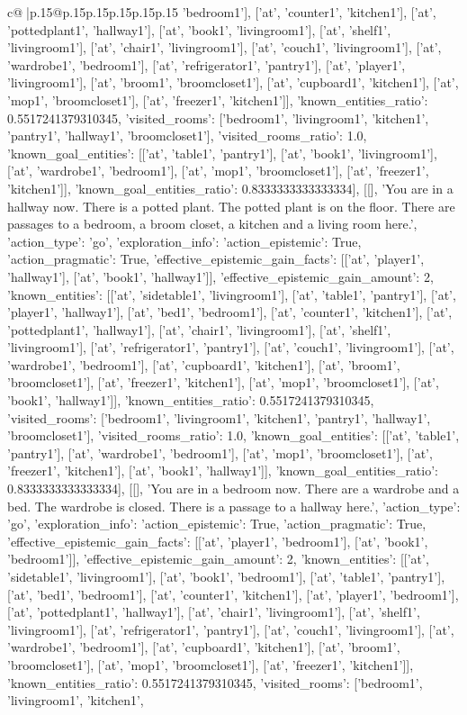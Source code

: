 \documentclass{article}
\begin{document}
{\begin{supertabular}{c@{$\;$}|p{.15\linewidth}@{}p{.15\linewidth}p{.15\linewidth}p{.15\linewidth}p{.15\linewidth}p{.15\linewidth}}
{{{'bedroom1'], ['at', 'counter1', 'kitchen1'], ['at', 'pottedplant1', 'hallway1'], ['at', 'book1', 'livingroom1'], ['at', 'shelf1', 'livingroom1'], ['at', 'chair1', 'livingroom1'], ['at', 'couch1', 'livingroom1'], ['at', 'wardrobe1', 'bedroom1'], ['at', 'refrigerator1', 'pantry1'], ['at', 'player1', 'livingroom1'], ['at', 'broom1', 'broomcloset1'], ['at', 'cupboard1', 'kitchen1'], ['at', 'mop1', 'broomcloset1'], ['at', 'freezer1', 'kitchen1']], 'known_entities_ratio': 0.5517241379310345, 'visited_rooms': ['bedroom1', 'livingroom1', 'kitchen1', 'pantry1', 'hallway1', 'broomcloset1'], 'visited_rooms_ratio': 1.0, 'known_goal_entities': [['at', 'table1', 'pantry1'], ['at', 'book1', 'livingroom1'], ['at', 'wardrobe1', 'bedroom1'], ['at', 'mop1', 'broomcloset1'], ['at', 'freezer1', 'kitchen1']], 'known_goal_entities_ratio': 0.8333333333333334}}], [[], 'You are in a hallway now. There is a potted plant. The potted plant is on the floor. There are passages to a bedroom, a broom closet, a kitchen and a living room here.', {'action_type': 'go', 'exploration_info': {'action_epistemic': True, 'action_pragmatic': True, 'effective_epistemic_gain_facts': [['at', 'player1', 'hallway1'], ['at', 'book1', 'hallway1']], 'effective_epistemic_gain_amount': 2, 'known_entities': [['at', 'sidetable1', 'livingroom1'], ['at', 'table1', 'pantry1'], ['at', 'player1', 'hallway1'], ['at', 'bed1', 'bedroom1'], ['at', 'counter1', 'kitchen1'], ['at', 'pottedplant1', 'hallway1'], ['at', 'chair1', 'livingroom1'], ['at', 'shelf1', 'livingroom1'], ['at', 'refrigerator1', 'pantry1'], ['at', 'couch1', 'livingroom1'], ['at', 'wardrobe1', 'bedroom1'], ['at', 'cupboard1', 'kitchen1'], ['at', 'broom1', 'broomcloset1'], ['at', 'freezer1', 'kitchen1'], ['at', 'mop1', 'broomcloset1'], ['at', 'book1', 'hallway1']], 'known_entities_ratio': 0.5517241379310345, 'visited_rooms': ['bedroom1', 'livingroom1', 'kitchen1', 'pantry1', 'hallway1', 'broomcloset1'], 'visited_rooms_ratio': 1.0, 'known_goal_entities': [['at', 'table1', 'pantry1'], ['at', 'wardrobe1', 'bedroom1'], ['at', 'mop1', 'broomcloset1'], ['at', 'freezer1', 'kitchen1'], ['at', 'book1', 'hallway1']], 'known_goal_entities_ratio': 0.8333333333333334}}], [[], 'You are in a bedroom now. There are a wardrobe and a bed. The wardrobe is closed. There is a passage to a hallway here.', {'action_type': 'go', 'exploration_info': {'action_epistemic': True, 'action_pragmatic': True, 'effective_epistemic_gain_facts': [['at', 'player1', 'bedroom1'], ['at', 'book1', 'bedroom1']], 'effective_epistemic_gain_amount': 2, 'known_entities': [['at', 'sidetable1', 'livingroom1'], ['at', 'book1', 'bedroom1'], ['at', 'table1', 'pantry1'], ['at', 'bed1', 'bedroom1'], ['at', 'counter1', 'kitchen1'], ['at', 'player1', 'bedroom1'], ['at', 'pottedplant1', 'hallway1'], ['at', 'chair1', 'livingroom1'], ['at', 'shelf1', 'livingroom1'], ['at', 'refrigerator1', 'pantry1'], ['at', 'couch1', 'livingroom1'], ['at', 'wardrobe1', 'bedroom1'], ['at', 'cupboard1', 'kitchen1'], ['at', 'broom1', 'broomcloset1'], ['at', 'mop1', 'broomcloset1'], ['at', 'freezer1', 'kitchen1']], 'known_entities_ratio': 0.5517241379310345, 'visited_rooms': ['bedroom1', 'livingroom1', 'kitchen1', }}}
\end{supertabular}}
\end{document}

